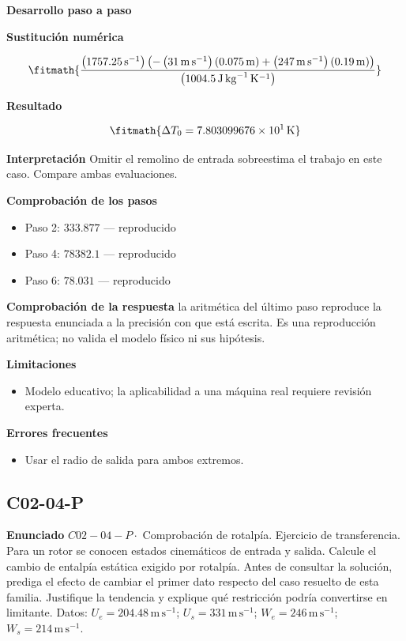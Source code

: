 \documentclass[10pt,openany]{book}
\begin{document}
\noindent\textbf{Desarrollo paso a paso}



\noindent\textbf{Sustitución numérica}

\[
\fitmath{\frac{\left(1757.25\,\mathrm{s}^{-1}\right) \left(- \left(31\,\mathrm{m}\,\mathrm{s}^{-1}\right) \left(0.075\,\mathrm{m}\right) + \left(247\,\mathrm{m}\,\mathrm{s}^{-1}\right) \left(0.19\,\mathrm{m}\right)\right)}{\left(1004.5\,\mathrm{J}\,\mathrm{kg}^{-1}\,\mathrm{K}^{-1}\right)}}
\]

\noindent\textbf{Resultado}

\[
\fitmath{\Delta T_0=7.803099676\times10^{1}\,\mathrm{K}}
\]

\noindent\textbf{Interpretación}
Omitir el remolino de entrada sobreestima el trabajo en este caso. Compare ambas evaluaciones.

\noindent\textbf{Comprobación de los pasos}
\begin{itemize}
\item Paso 2: $333.877$ — reproducido
\item Paso 4: $78382.1$ — reproducido
\item Paso 6: $78.031$ — reproducido
\end{itemize}

\noindent\textbf{Comprobación de la respuesta} la aritmética del último paso reproduce la respuesta enunciada a la precisión con que está escrita. Es una reproducción aritmética; no valida el modelo físico ni sus hipótesis.

\noindent\textbf{Limitaciones}
\begin{itemize}
\item Modelo educativo; la aplicabilidad a una máquina real requiere revisión experta.
\end{itemize}

\noindent\textbf{Errores frecuentes}
\begin{itemize}
\item Usar el radio de salida para ambos extremos.
\end{itemize}
\subsection*{C02-04-P}

\noindent\textbf{Enunciado}
\(C02-04-P \cdot\) Comprobación de rotalpía. Ejercicio de transferencia. Para un rotor se conocen estados cinemáticos de entrada y salida. Calcule el cambio de entalpía estática exigido por rotalpía. Antes de consultar la solución, prediga el efecto de cambiar el primer dato respecto del caso resuelto de esta familia. Justifique la tendencia y explique qué restricción podría convertirse en limitante. Datos: \(U_e=204.48\, \mathrm{m}\,\mathrm{s}^{-1}\); \(U_s=331\, \mathrm{m}\,\mathrm{s}^{-1}\); \(W_e=246\, \mathrm{m}\,\mathrm{s}^{-1}\); \(W_s=214\, \mathrm{m}\,\mathrm{s}^{-1}\).
\end{document}
